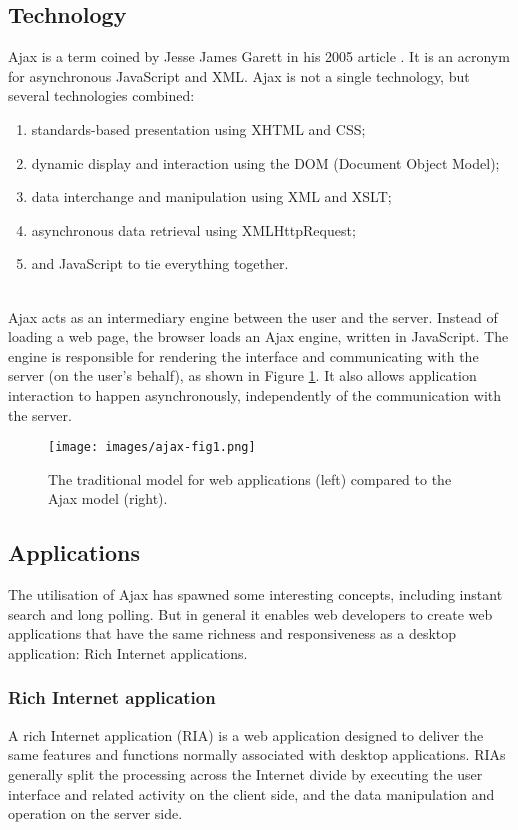 \subsection{Technology}
Ajax is a term coined by Jesse James Garett in his 2005 article \cite{garrett2005ajax}. It is an acronym for asynchronous JavaScript and XML. Ajax is not a single technology, but several technologies combined:\\
\begin{enumerate}
	\item standards-based presentation using XHTML and CSS;
	\item dynamic display and interaction using the DOM (Document Object Model);
	\item data interchange and manipulation using XML and XSLT;
	\item asynchronous data retrieval using XMLHttpRequest;
	\item and JavaScript to tie everything together.
\end{enumerate} 
~\\
Ajax acts as an intermediary engine between the user and the server. Instead of loading a web page, the browser loads an Ajax engine, written in JavaScript. The engine is responsible for rendering the interface and communicating with the server (on the user's behalf), as shown in Figure \ref{fig:engine}. It also allows application interaction to happen asynchronously, independently of the communication with the server.

\begin{figure}	
	\centering
	\texttt{[image: images/ajax-fig1.png]}
	\caption{The traditional model for web applications (left) compared to the Ajax model (right).}
	\label{fig:engine}
\end{figure}	

\subsection{Applications}
The utilisation of Ajax has spawned some interesting concepts, including instant search and long polling. But in general it enables web developers to create web applications that have the same richness and responsiveness as a desktop application: Rich Internet applications.

\subsubsection{Rich Internet application}
A rich Internet application (RIA) is a web application designed to deliver the same features and functions normally associated with desktop applications. RIAs generally split the processing across the Internet divide by executing the user interface and related activity on the client side, and the data manipulation and operation on the server side.\\
 
